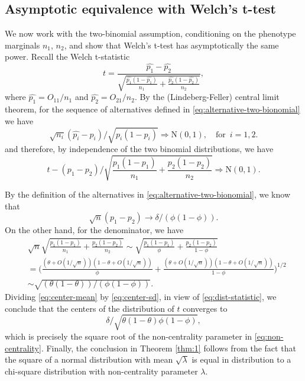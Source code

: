 \subsection{Asymptotic equivalence with Welch's t-test}

We now work with the two-binomial assumption, conditioning on the phenotype marginals $n_1$, $n_2$, and show that Welch's t-test has asymptotically the same power.
Recall the Welch t-statistic
\begin{equation} \label{eq:Welch-t}
    t = \frac{\widehat{p_1} - \widehat{p_2}}{\sqrt{\frac{\widehat{p_1}(1-\widehat{p_1})}{n_1} + \frac{\widehat{p_2}(1-\widehat{p_2})}{n_2}}},
\end{equation}
where $\widehat{p_1} = O_{11}/n_1$ and $\widehat{p_2} = O_{21}/n_2$.
By the (Lindeberg-Feller) central limit theorem, for the sequence of alternatives defined in \eqref{eq:alternative-two-bionomial} we have 
\begin{equation*}
    \sqrt{n_i}(\widehat{p_i} - p_i)\big/\sqrt{p_i(1-p_i)} \Rightarrow \mathrm{N}(0,1),
    \quad \text{for }\,i=1,2.
\end{equation*}
and therefore, by independence of the two binomial distributions, we have 
\begin{equation} \label{eq:dist-statistic}
    t - (p_1-p_2)\Big/\sqrt{\frac{{p_1}(1-{p_1})}{n_1} + \frac{{p_2}(1-{p_2})}{n_2}} \Rightarrow \mathrm{N}(0,1).
\end{equation}

By the definition of the alternatives in \eqref{eq:alternative-two-bionomial}, we know that 
\begin{equation} \label{eq:center-mean}
    \sqrt{n}(p_1-p_2) \to \delta/(\phi(1-\phi)).
\end{equation}
On the other hand, for the denominator, we have
\begin{align}
    &\sqrt{n}\sqrt{\frac{{p_1}(1-{p_1})}{n_1} + \frac{{p_2}(1-{p_2})}{n_2}} \sim \sqrt{\frac{{p_1}(1-{p_1})}{\phi} + \frac{{p_2}(1-{p_2})}{1-\phi}} \nonumber \\
    &= \Bigg(\frac{(\theta + O(1/\sqrt{n}))(1-\theta + O(1/\sqrt{n}))}{\phi} + \frac{(\theta + O(1/\sqrt{n}))(1-\theta + O(1/\sqrt{n}))}{1-\phi}\Bigg)^{1/2} \nonumber \\
    &\sim \sqrt{(\theta(1-\theta)) / (\phi(1-\phi))}. \label{eq:center-sd}
\end{align}
Dividing \eqref{eq:center-mean} by \eqref{eq:center-sd}, in view of \eqref{eq:dist-statistic}, we conclude that the centers of the distribution of $t$ converges to 
$$\delta/\sqrt{\theta(1-\theta)\phi(1-\phi)},$$
which is precisely the square root of the non-centrality parameter in \eqref{eq:non-centrality}.
Finally, the conclusion in Theorem \ref{thm:1} follows from the fact that the square of a normal distribution with mean $\sqrt{\lambda}$ is equal in distribution to a chi-square distribution with non-centrality parameter $\lambda$.

